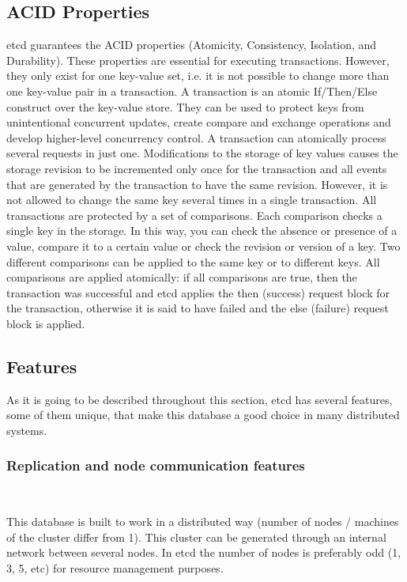 \documentclass[screen,review]{acmart}
\begin{document}
\subsection{ACID Properties}
etcd guarantees the ACID properties (Atomicity, Consistency, Isolation, and Durability). These properties are essential for executing transactions. However, they only exist for one key-value set, i.e. it is not possible to change more than one key-value pair in a transaction.
A transaction is an atomic If/Then/Else construct over the key-value store. They can be used to protect keys from unintentional concurrent updates, create compare and exchange operations and develop higher-level concurrency control.
A transaction can atomically process several requests in just one. Modifications to the storage of key values causes the storage revision to be incremented only once for the transaction and all events that are generated by the transaction to have the same revision. However, it is not allowed to change the same key several times in a single transaction.
All transactions are protected by a set of comparisons. Each comparison checks a single key in the storage. In this way, you can check the absence or presence of a value, compare it to a certain value or check the revision or version of a key. Two different comparisons can be applied to the same key or to different keys. All comparisons are applied atomically: if all comparisons are true, then the transaction was successful and etcd applies the then (success) request block for the transaction, otherwise it is said to have failed and the else (failure) request block is applied.


\subsection{Features}

As it is going to be described throughout this section, etcd has several features, some of them unique, that make this database a good choice in many distributed systems.\\

\subsubsection{Replication and node communication features}~\

This database is built to work in a distributed way\cite{etcd_clustering} (number of nodes / machines of the cluster differ from 1). This cluster can be generated through an internal network between several nodes. In etcd the number of nodes is preferably odd (1, 3, 5, etc) for resource management purposes.
\end{document}
